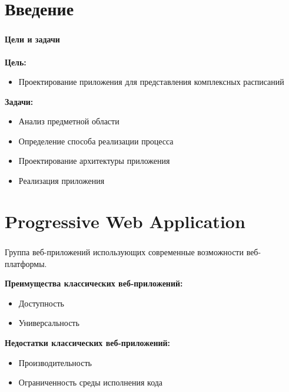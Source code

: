 
\frame[plain]{\titlepage}


\section{Введение}

\begin{frame}
\frametitle{\insertsection}
\framesubtitle{Цели и задачи}

\textbf{Цель:}
\begin{itemize}
    \item Проектирование приложения для представления комплексных расписаний
\end{itemize}

\textbf{Задачи:}
\begin{itemize}
    \item Анализ предметной области
    \item Определение способа реализации процесса
    \item Проектирование архитектуры приложения
    \item Реализация приложения
\end{itemize}

\end{frame}


\section{Progressive Web Application}

\begin{frame}
\frametitle{\insertsection}

Группа веб-приложений использующих современные возможности веб-платформы.

\vspace{5mm}

\textbf{Преимущества классических веб-приложений:}
\begin{itemize}
    \item Доступность
    \item Универсальность
\end{itemize}

\textbf{Недостатки классических веб-приложений:}
\begin{itemize}
    \item Производительность
    \item Ограниченность среды исполнения кода
\end{itemize}

\end{frame}

